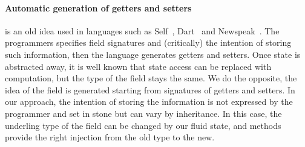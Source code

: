 % 


\paragraph{Automatic generation of getters and setters}
is an old idea used in languages such as 
Self~\cite{Ungar1987self}, Dart~\cite{Dart} and Newspeak~\cite{Bracha_thenewspeak}.
The programmers specifies field signatures and (critically) the intention of storing such information,  
then the language generates getters and setters.
Once state is abstracted away, it is well known that state
access can be replaced with computation, but the type of the field stays the same.
We do the opposite, the idea of the field is generated starting from signatures of 
getters and setters. %
In our approach, the intention of storing the information is not expressed by the programmer and set in stone  
but can vary by inheritance. 
In this case, the underling type of the field can be changed by our fluid state, 
 and \Q@with@ methods provide the right injection from the old type to the new.

